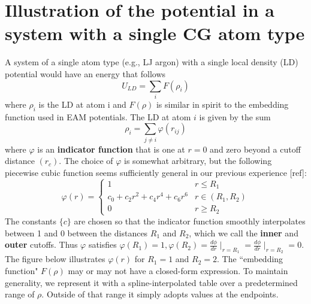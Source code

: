 \documentclass[10pt]{article}
\begin{document}
\section*{Illustration of the potential in a system with a single CG atom type}
A system of a single atom type (e.g., LJ argon) with a single local density (LD) potential would have an energy that follows
%
\begin{equation*}
U_{LD} = \sum_i F(\rho_i)
\end{equation*}
%
where $\rho_i$ is the LD at atom i and $F(\rho)$ is similar in spirit to the embedding function used in EAM potentials. The LD at atom $i$ is given by the sum
%
\begin{equation*}
\rho_i = \sum_{j \neq i} \varphi(r_{ij})
\end{equation*}
%
where $\varphi$ is an \textbf{indicator function} that is one at $r=0$ and zero beyond a cutoff distance $(r_c)$. The choice of $\varphi$ is somewhat arbitrary, but the following piecewise cubic function seems sufficiently general in our previous experience [ref]:
%
\begin{equation*}
\varphi(r) = \begin{cases} 
      1 & r \le R_1\\
      c_0 + c_2r^2 + c_4r^4 + c_6r^6  & r \in (R_1, R_2)\\
      0 & r \ge R_2
   \end{cases}
\end{equation*}
%
The constants $\{c\}$ are chosen so that the indicator function smoothly interpolates between 1 and 0 between the distances $R_1$ and $R_2$, which we call the \textbf{inner} and \textbf{outer} cutoffs. Thus $\varphi$ satisfies $\varphi(R_1) = 1, \varphi(R_2) = \frac{d\phi}{dr} \mid_{r=R_1} = \frac{d\phi}{dr} \mid_{r=R_2} = 0$.
%
The figure below illustrates $\varphi(r)$ for $R_1=1$ and $R_2=2$.
%
%
The ``embedding function" $F(\rho)$ may or may not have a closed-form expression. To maintain generality, we represent it with a spline-interpolated table over a predetermined range of $\rho$. Outside of that range it simply adopts values at the endpoints.
%
%
%
\end{document}
